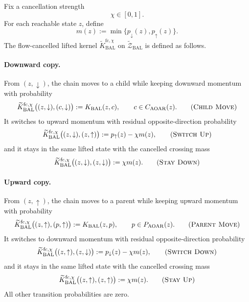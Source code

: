 \documentclass{article}
\numberwithin{theorem}{section}
\numberwithin{proposition}{section}
\numberwithin{corollary}{section}
\numberwithin{lemma}{section}
\numberwithin{conjecture}{section}
\numberwithin{remark}{section}
\numberwithin{definition}{section}
\numberwithin{assumption}{section}
\numberwithin{example}{section}
\newcommand{\calZ}{{\mathcal{Z}}}
\begin{document}
\begin{definition}
\label{def:flow_cancelled_momentum_kernel}
Fix a cancellation strength
\begin{equation*}
    \chi\in[0,1].
\end{equation*}
For each reachable state $z$, define
\begin{equation*}
    m(z):=\min\{p_{\downarrow}(z),p_{\uparrow}(z)\}.
\end{equation*}
The flow-cancelled lifted kernel $\widetilde K_{\mathrm{BAL}}^{\mathrm{fc},\chi}$ on $\widetilde{\calZ}_{\mathrm{BAL}}$ is defined as follows.

\paragraph{Downward copy.}
From $(z,\downarrow)$, the chain moves to a child while keeping downward momentum with probability
\begin{equation*}
    \widetilde K_{\mathrm{BAL}}^{\mathrm{fc},\chi}\bigl((z,\downarrow),(c,\downarrow)\bigr)
    := K_{\mathrm{BAL}}(z,c), \qquad c\in C_{\mathrm{AOAR}}(z).
    \tag{\textsc{Child Move}}
\end{equation*}
It switches to upward momentum with residual opposite-direction probability
\begin{equation*}
    \widetilde K_{\mathrm{BAL}}^{\mathrm{fc},\chi}\bigl((z,\downarrow),(z,\uparrow)\bigr)
    := p_{\uparrow}(z)-\chi m(z),
    \tag{\textsc{Switch Up}}
\end{equation*}
and it stays in the same lifted state with the cancelled crossing mass
\begin{equation*}
    \widetilde K_{\mathrm{BAL}}^{\mathrm{fc},\chi}\bigl((z,\downarrow),(z,\downarrow)\bigr)
    := \chi m(z).
    \tag{\textsc{Stay Down}}
\end{equation*}

\paragraph{Upward copy.}
From $(z,\uparrow)$, the chain moves to a parent while keeping upward momentum with probability
\begin{equation*}
    \widetilde K_{\mathrm{BAL}}^{\mathrm{fc},\chi}\bigl((z,\uparrow),(p,\uparrow)\bigr)
    := K_{\mathrm{BAL}}(z,p), \qquad p\in P_{\mathrm{AOAR}}(z).
    \tag{\textsc{Parent Move}}
\end{equation*}
It switches to downward momentum with residual opposite-direction probability
\begin{equation*}
    \widetilde K_{\mathrm{BAL}}^{\mathrm{fc},\chi}\bigl((z,\uparrow),(z,\downarrow)\bigr)
    := p_{\downarrow}(z)-\chi m(z),
    \tag{\textsc{Switch Down}}
\end{equation*}
and it stays in the same lifted state with the cancelled crossing mass
\begin{equation*}
    \widetilde K_{\mathrm{BAL}}^{\mathrm{fc},\chi}\bigl((z,\uparrow),(z,\uparrow)\bigr)
    := \chi m(z).
    \tag{\textsc{Stay Up}}
\end{equation*}
All other transition probabilities are zero.
\end{definition}
\end{document}

